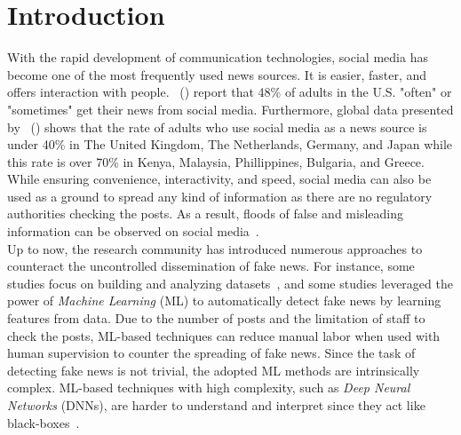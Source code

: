 
\chapter{Introduction}\label{chapter:introduction}

With the rapid development of communication technologies, social media has become one of the most frequently used news sources. It is easier, faster, and offers interaction with people.~\citeauthor{NewsConsumptionAcrossSocialMedia_pewresearch} (\citeyear{NewsConsumptionAcrossSocialMedia_pewresearch}) report that 48\% of adults in the U.S. "often" or "sometimes" get their news from social media. Furthermore, global data presented by~\citeauthor{StatistaUsageOfSocialMedia_Watson} (\citeyear{StatistaUsageOfSocialMedia_Watson}) shows that the rate of adults who use social media as a news source is under 40\% in The United Kingdom, The Netherlands, Germany, and Japan while this rate is over 70\% in Kenya, Malaysia, Phillippines, Bulgaria, and Greece.\\
While ensuring convenience, interactivity, and speed, social media can also be used as a ground to spread any kind
of information as there are no regulatory authorities checking the posts. As a result, floods of false and misleading information can be observed on social media~\parencite{SocialMediaAndFakeNewsIn2016Election_Allcott}.\\
Up to now, the research community has introduced numerous approaches to counteract the uncontrolled dissemination of fake news. For instance, some studies focus on building and analyzing datasets~\parencite{FakeNewsDetectionOnSocialMediaADataMiningPerspective_Shu, LiarLiarPantsOnFire_Wang, FakeReddit_Nakamura, SomeLikeItHoaxDataset_Tacchini, BuzzfaceDataset_Santia, UPFD_Dataset_Shu}, and some studies leveraged the power of \emph{Machine Learning} (ML) to automatically detect fake news by learning features from data. Due to the number of posts and the limitation of staff to check the posts, ML-based techniques can reduce manual labor when used with human supervision to counter the spreading of fake news. Since the task of detecting fake news is not trivial, the adopted ML methods are intrinsically complex. ML-based techniques with high complexity, such as \emph{Deep Neural Networks} (DNNs), are harder to understand and interpret since they act like black-boxes~\parencite{CanWeOpenTheBlackBoxOfAI_Castelvecchi}.\\

